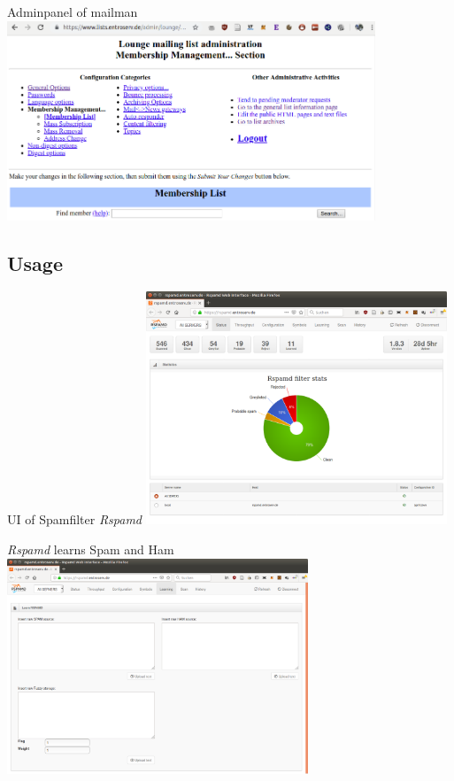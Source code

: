 \documentclass{beamer}
\begin{document}
\begin{frame}[fragile]{\insertsection}{\insertsubsection}
	\vspace{-0.5cm}
	Adminpanel of mailman
	\includegraphics[width=11cm]{mailmanadmin.png}\\
\end{frame}	

\subsection{Usage}
\begin{frame}[fragile]{\insertsection}{\insertsubsection}
	UI of Spamfilter \emph{Rspamd}
	\includegraphics[width=9cm]{rspamdgui.png}\\
\end{frame}	

\begin{frame}[fragile]{\insertsection}{\insertsubsection}
	\emph{Rspamd} learns Spam and Ham
	\includegraphics[width=9cm]{rspamdguilearn.png}\\
\end{frame}	
\end{document}
